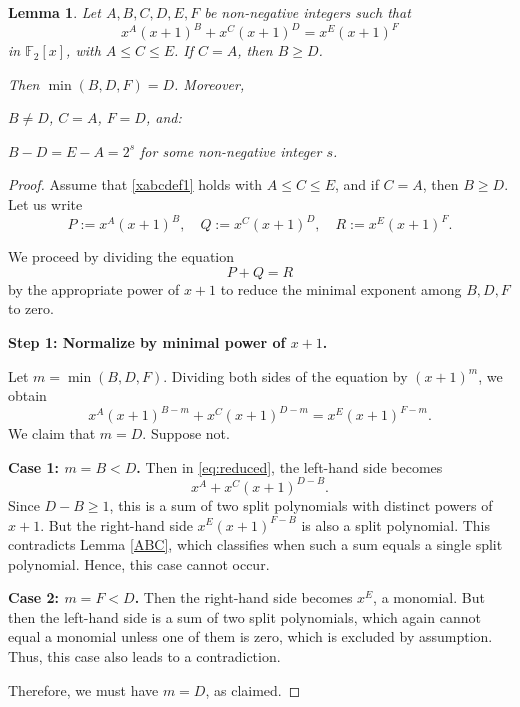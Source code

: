\documentclass[10pt,a4paper]{amsart}
\newtheorem{lemma}{Lemma}
\def\F{\mathbb{F}}
\begin{document}
\begin{lemma}
\label{ACEsept}
Let \( A, B, C, D, E, F \) be non-negative integers such that
\begin{equation}
\label{xabcdef1}
x^A(x+1)^B + x^C(x+1)^D = x^E(x+1)^F
\end{equation}
in \( \F_2[x] \), with \( A \leq C \leq E \). If \( C = A \), then \( B \geq D \).

Then \( \min(B, D, F) = D \). Moreover,
   
     \( B \neq D \), \( C = A \), \( F = D \), and:
    
         \( B - D = E - A = 2^s \) for some non-negative integer \( s \).
       
\end{lemma}

\begin{proof}
Assume that \eqref{xabcdef1} holds with \( A \leq C \leq E \), and if \( C = A \), then \( B \geq D \). Let us write
\[
P := x^A(x+1)^B, \quad Q := x^C(x+1)^D, \quad R := x^E(x+1)^F.
\]

We proceed by dividing the equation
\[
P + Q = R
\]
by the appropriate power of \( x+1 \) to reduce the minimal exponent among \( B, D, F \) to zero.

\textbf{Step 1: Normalize by minimal power of \( x+1 \).}

Let \( m = \min(B, D, F) \). Dividing both sides of the equation by \( (x+1)^m \), we obtain
\begin{equation}
\label{eq:reduced}
x^A(x+1)^{B - m} + x^C(x+1)^{D - m} = x^E(x+1)^{F - m}.
\end{equation}
We claim that \( m = D \). Suppose not.

\textbf{Case 1: \( m = B < D \).} Then in \eqref{eq:reduced}, the left-hand side becomes
\[
x^A + x^C(x+1)^{D - B}.
\]
Since \( D - B \geq 1 \), this is a sum of two split polynomials with distinct powers of \( x+1 \). But the right-hand side \( x^E(x+1)^{F - B} \) is also a split polynomial. This contradicts Lemma \ref{ABC}, which classifies when such a sum equals a single split polynomial. Hence, this case cannot occur.

\textbf{Case 2: \( m = F < D \).} Then the right-hand side becomes \( x^E \), a monomial. But then the left-hand side is a sum of two split polynomials, which again cannot equal a monomial unless one of them is zero, which is excluded by assumption. Thus, this case also leads to a contradiction.

Therefore, we must have \( m = D \), as claimed.


\end{proof}
\end{document}
